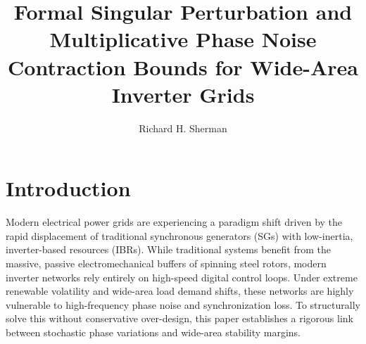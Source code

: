 \documentclass[10pt,journal,compsoc]{IEEEtran}
\begin{document}
\title{Formal Singular Perturbation and Multiplicative Phase Noise Contraction Bounds for Wide-Area Inverter Grids}
\author{Richard H. Sherman}
\maketitle

\section{Introduction}

Modern electrical power grids are experiencing a paradigm shift driven by the rapid displacement of traditional synchronous generators (SGs) with low-inertia, inverter-based resources (IBRs). While traditional systems benefit from the massive, passive electromechanical buffers of spinning steel rotors, modern inverter networks rely entirely on high-speed digital control loops. Under extreme renewable volatility and wide-area load demand shifts, these networks are highly vulnerable to high-frequency phase noise and synchronization loss. To structurally solve this without conservative over-design, this paper establishes a rigorous link between stochastic phase variations and wide-area stability margins.
\end{document}
